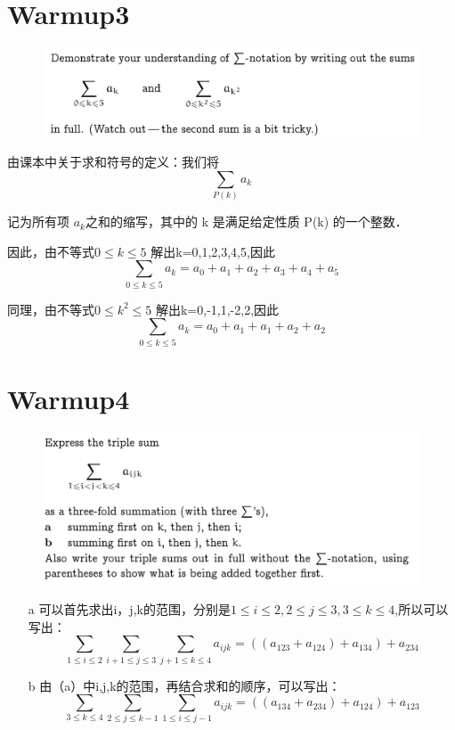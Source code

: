 \documentclass[]{article}
\begin{document}
\section*{Warmup3}
\begin{figure}[htb]
	\includegraphics[scale=1]{W3}
\end{figure}
由课本中关于求和符号的定义：我们将 
\begin{equation}
	\sum_{P(k)} a_{k}
\end{equation}


记为所有项  $a_{k}$之和的缩写，其中的 k 是满足给定性质 P(k) 的一个整数．\par 
因此，由不等式$ 0 \le k \le 5 $ 解出k=0,1,2,3,4,5,因此
\begin{equation}
	\sum_{0 \le k \le 5} a_{k} = a_{0} + a_{1} + a_{2} + a_{3} + a_{4} +a_{5}  
\end{equation}

同理，由不等式$ 0 \le k^2 \le 5 $ 解出k=0,-1,1,-2,2,因此
\begin{equation}
	\sum_{0 \le k \le 5} a_{k} = a_{0} + a_{1} + a_{1} + a_{2} + a_{2}  
\end{equation}

\section*{Warmup4}
\begin{figure}[htb]
	\includegraphics[scale=1]{W4}
\end{figure}
\begin{enumerate}
	\item[a] 可以首先求出i，j,k的范围，分别是$1 \le i \le 2,2 \le j \le 3,3 \le k \le 4$,所以可以写出：
	\begin{equation}
		\sum_{1 \le i \le 2}\sum_{i+1 \le j \le 3}\sum_{j+1 \le k \le 4}a_{ijk} = ((a_{123}+a_{124})+a_{134})+a_{234}
	\end{equation}

	\item[b] 由（a）中i,j,k的范围，再结合求和的顺序，可以写出：
	\begin{equation}
		\sum_{3 \le k \le 4}\sum_{2 \le j \le k-1}\sum_{1 \le i \le j-1}a_{ijk} = ((a_{134}+a_{234})+a_{124})+a_{123}
	\end{equation}
\end{enumerate}
\end{document}
